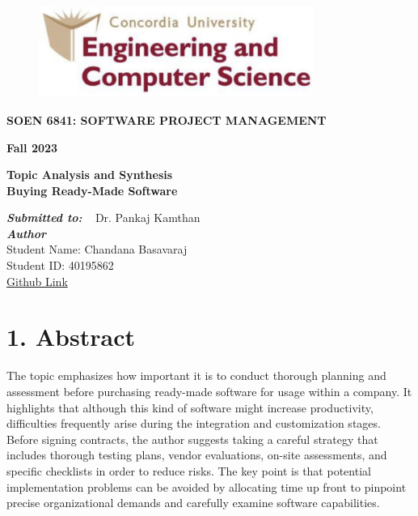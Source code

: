\documentclass[letterpaper, 11pt]{report}
\begin{document}
\begin{titlepage}
\vspace*{0.7in}
\begin{center}
\begin{figure}[htb]
\begin{center}
\includegraphics[width=9cm]{CON_UNIV_LOGO.png}
\end{center}
\end{figure}
\vspace*{0.3in}
\begin{Large}
\textbf{SOEN 6841: SOFTWARE PROJECT MANAGEMENT} \\
\end{Large}
\vspace*{0.1in}
\begin{Large}
\textbf{Fall 2023} \\
\end{Large}
\vspace*{0.9in}
\begin{Large}
\textbf{Topic Analysis and Synthesis
\\
Buying Ready-Made Software} \\
\end{Large}
\vspace*{0.75in}
\begin{Large}
\textbf{\emph{Submitted to:}} \
\vspace*{0.6in}
Dr. Pankaj Kamthan\\
\textbf{\emph{Author}} \\
\vspace*{0.2in}
Student Name: Chandana Basavaraj\\
Student ID: 40195862 \\
\vspace*{0.2in}
\href{https://github.com/CHAB5/SOEN-6841_TAS}{Github Link}
\end{Large}
\end{center}
\end{titlepage}
\tableofcontents
\newpage
{}
\section*{1. Abstract}
The topic emphasizes how important it is to conduct thorough planning and assessment before purchasing ready-made software for usage within a company. It highlights that although this kind of software might increase productivity, difficulties frequently arise during the integration and customization stages. Before signing contracts, the author suggests taking a careful strategy that includes thorough testing plans, vendor evaluations, on-site assessments, and specific checklists in order to reduce risks. The key point is that potential implementation problems can be avoided by allocating time up front to pinpoint precise organizational demands and carefully examine software capabilities.\\
\end{document}
